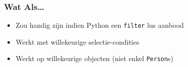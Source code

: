 \begin{frame}
  \frametitle{Wat Als\dots}
  \begin{itemize}
    \item Zou handig zijn indien Python een {\tt filter} lus aanbood
  \end{itemize}
  \begin{itemize}
    \item Werkt met willekeurige selectie-condities
    \item Werkt op willekeurige objecten (niet enkel \texttt{Person}s)
  \end{itemize}
\end{frame}
